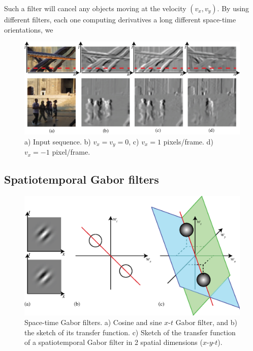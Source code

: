 Such a filter will cancel any objects moving at the velocity $(v_x,v_y)$. By using different filters, each one computing derivatives a long different space-time orientations, we 



\begin{figure}
\includegraphics[width=1\linewidth]{figures/temporal_filters/seq_filtered_der.eps}
\caption{a) Input sequence. b) $v_x=v_y=0$, c) $v_x=1$ pixels/frame. d) $v_x=-1$ pixel/frame.} 
\label{fig:tunedfilter}
\end{figure}


%
%





\subsection{Spatiotemporal Gabor filters}

\begin{figure}
\centerline{
\includegraphics[width=1\linewidth]{figures/temporal_filters/gabor_spacetime_FT.eps}
}
\caption{Space-time Gabor filters. a) Cosine and sine $x$-$t$ Gabor filter, and b) the sketch of its transfer function. c) Sketch of the transfer function of a spatiotemporal Gabor filter in 2 spatial dimensions ($x$-$y$-$t$).}
\label{fig:spacetimefilts}
\end{figure}


